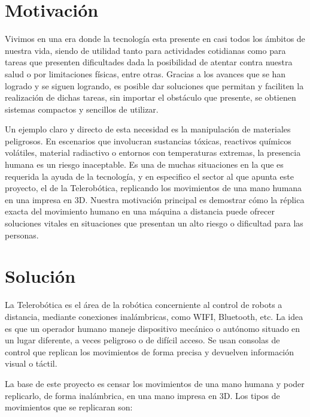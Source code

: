 \documentclass[10pt]{article}
\begin{document}
\newpage																		
\tableofcontents 
\newpage



\section{Motivación}

Vivimos en una era donde la tecnología esta presente en casi todos los ámbitos de nuestra vida, siendo de utilidad tanto para actividades cotidianas como para tareas que presenten dificultades dada la posibilidad de atentar contra nuestra salud o por limitaciones físicas, entre otras. Gracias a los avances que se han logrado y se siguen logrando, es posible dar soluciones que permitan y faciliten la realización de dichas tareas, sin importar el obstáculo que presente, se obtienen sistemas compactos y sencillos de utilizar.

Un ejemplo claro y directo de esta necesidad es la manipulación de materiales peligrosos. En escenarios que involucran sustancias tóxicas, reactivos químicos volátiles, material radiactivo o entornos con temperaturas extremas, la presencia humana es un riesgo inaceptable. Es una de muchas situaciones en la que es requerida la ayuda de la tecnología, y en especifico el sector al que apunta este proyecto, el de la  Telerobótica, replicando los movimientos de una mano humana en una impresa en 3D. Nuestra motivación principal es demostrar cómo la réplica exacta del movimiento humano en una máquina a distancia puede ofrecer soluciones vitales en situaciones que presentan un alto riesgo o dificultad para las personas.


\section{Solución}

La Telerobótica es el área de la robótica concerniente al control de robots a distancia, mediante conexiones inalámbricas, como WIFI, Bluetooth, etc. La idea es que un operador humano maneje dispositivo mecánico o autónomo situado en un lugar diferente, a veces peligroso o de difícil acceso. Se usan consolas de control que replican los movimientos de forma precisa y devuelven información visual o táctil.

La base de este proyecto es censar los movimientos de una mano humana y poder replicarlo, de forma inalámbrica, en una mano impresa en 3D. Los tipos de movimientos que se replicaran son:
\end{document}
